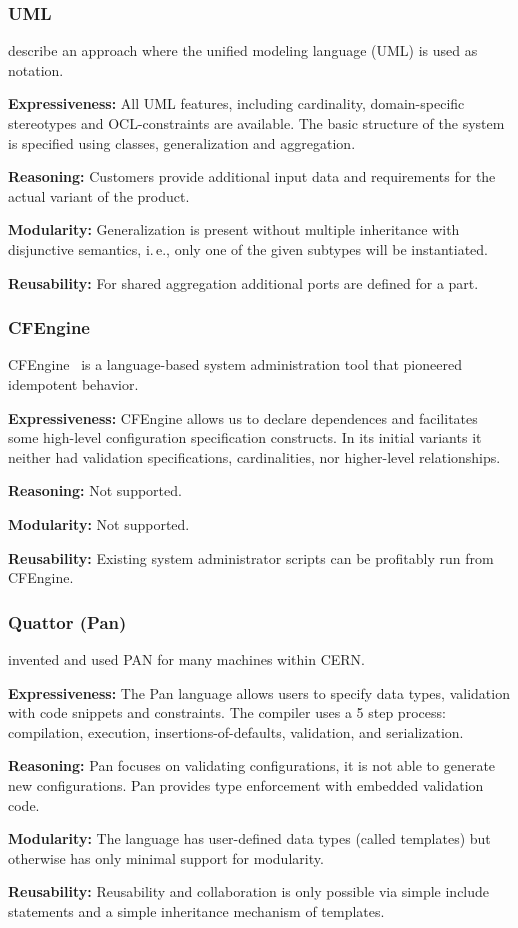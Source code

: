 \begin{frame}
	\frametitle{UML}
	\citet{felfernig1999knowledge,felfernig2000uml,felfernig2002joint} describe an approach where the unified modeling language (UML) is used as notation.

	\textbf{Expressiveness:}
	All UML features, including cardinality, domain-specific stereotypes and OCL-constraints are available.
	The basic structure of the system is specified using classes, generalization and aggregation.

	\textbf{Reasoning:}
	Customers provide additional input data and requirements for the actual variant of the product.

	\textbf{Modularity:}
	Generalization is present without multiple inheritance with disjunctive semantics, i.\,e., only one of the given subtypes will be instantiated.

	\textbf{Reusability:}
	For shared aggregation additional ports are defined for a part.
\end{frame}


\begin{frame}
	\frametitle{CFEngine}

	CFEngine~\cite{burgess2003theory,burgess1995cfengine,pandey2012investigating} is a language-based system administration tool that pioneered idempotent behavior.

	\textbf{Expressiveness:}
	CFEngine allows us to declare dependences and facilitates some high-level configuration specification constructs.
	In its initial variants it neither had validation specifications, cardinalities, nor higher-level relationships.

	\textbf{Reasoning:}
	Not supported.

	\textbf{Modularity:}
	Not supported.

	\textbf{Reusability:}
	Existing system administrator scripts can be profitably run from CFEngine.
\end{frame}



\begin{frame}
	\frametitle{Quattor (Pan)}

	\citet{cons2002pan} invented and used PAN for many machines within CERN.

	\textbf{Expressiveness:}
	The Pan language allows users to specify data types, validation with code snippets and constraints.
	The compiler uses a 5 step process: compilation, execution, insertions-of-defaults, validation, and serialization.

	\textbf{Reasoning:}
	Pan focuses on validating configurations, it is not able to generate new configurations.
	Pan provides type enforcement with embedded validation code.

	\textbf{Modularity:}
	The language has user-defined data types (called templates) but otherwise has only minimal support for modularity.

	\textbf{Reusability:}
	Reusability and collaboration is only possible via simple include statements and a simple inheritance mechanism of templates.
\end{frame}


